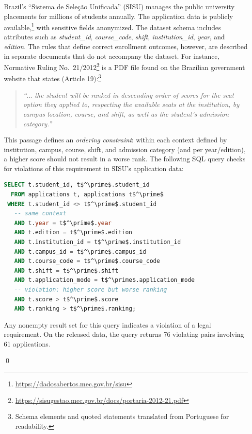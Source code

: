 \begin{example}
\label{ex:intro}
Brazil's ``Sistema de Sele\c{c}\~{a}o Unificada'' (SISU) manages the public university placements for millions of students annually. The application data is publicly available,\footnote{\url{https://dadosabertos.mec.gov.br/sisu}} with sensitive fields anonymized. The dataset schema includes attributes such as \emph{student\_id}, \emph{course\_code}, \emph{shift}, \emph{institution\_id}, \emph{year}, and \emph{edition}. The rules that define correct enrollment outcomes, however, are described in separate documents that do not accompany the dataset. For instance, Normative Ruling No.\ 21/2012\footnote{\url{https://sisugestao.mec.gov.br/docs/portaria-2012-21.pdf}} is a PDF file found on the Brazilian government website that states (Article 19):\footnote{Schema elements and quoted statements translated from Portuguese for readability.}

\begin{quote}
\textit{``$\ldots$ the student will be ranked in descending order of scores for the seat option they applied to, respecting the available seats at the institution, by campus location, course, and shift, as well as the student's admission category.''}
\end{quote}

This passage defines an \emph{ordering constraint}: within each context defined by institution, campus, course, shift, and admission category (and per year/edition), a higher score should not result in a worse rank. The following SQL query checks for violations of this requirement in SISU's application data:

\begin{lstlisting}[language=SQL, frame=none, basicstyle=\footnotesize\ttfamily, mathescape]
SELECT t.student_id, t$^\prime$.student_id
  FROM applications t, applications t$^\prime$
 WHERE t.student_id <> t$^\prime$.student_id
   -- same context
   AND t.year = t$^\prime$.year
   AND t.edition = t$^\prime$.edition
   AND t.institution_id = t$^\prime$.institution_id
   AND t.campus_id = t$^\prime$.campus_id
   AND t.course_code = t$^\prime$.course_code
   AND t.shift = t$^\prime$.shift
   AND t.application_mode = t$^\prime$.application_mode
   -- violation: higher score but worse ranking
   AND t.score > t$^\prime$.score
   AND t.ranking > t$^\prime$.ranking;
\end{lstlisting}

Any nonempty result set for this query indicates a violation of a legal requirement. On the released data, the query returns 76 violating pairs involving 61 applications.

\qed
\end{example}

